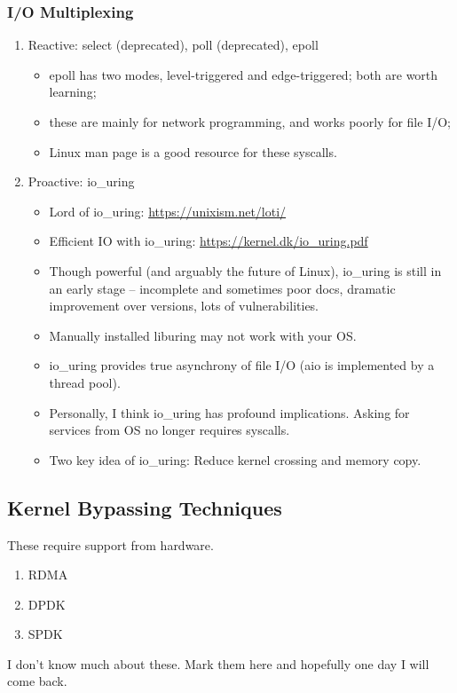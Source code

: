 \documentclass{article}
\begin{document}
\subsubsection{I/O Multiplexing}
\begin{enumerate}
    \item Reactive: select (deprecated), poll (deprecated), epoll
    \begin{itemize}
        \item epoll has two modes, level-triggered and edge-triggered; both are worth learning;
        \item these are mainly for network programming, and works poorly for file I/O;
        \item Linux man page is a good resource for these syscalls.
    \end{itemize}
    \item Proactive: io\_uring
    \begin{itemize}
        \item Lord of io\_uring:
        \href{https://unixism.net/loti/}{https://unixism.net/loti/}
        \item Efficient IO with io\_uring:
        \href{https://kernel.dk/io_uring.pdf}{https://kernel.dk/io\_uring.pdf}
        \item Though powerful (and arguably the future of Linux), io\_uring is still in an early stage -- incomplete and sometimes poor docs, dramatic improvement over versions, lots of vulnerabilities.
        \item Manually installed liburing may not work with your OS.
        \item io\_uring provides true asynchrony of file I/O (aio is implemented by a thread pool).
        \item Personally, I think io\_uring has profound implications.
        Asking for services from OS no longer requires syscalls.
        \item Two key idea of io\_uring:
        Reduce kernel crossing and memory copy.
    \end{itemize}
\end{enumerate}
\subsection{Kernel Bypassing Techniques}
These require support from hardware.
\begin{enumerate}
    \item RDMA
    \item DPDK
    \item SPDK
\end{enumerate}
I don't know much about these.
Mark them here and hopefully one day I will come back.
\end{document}
